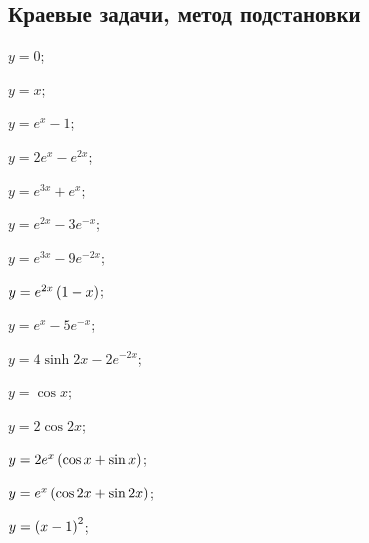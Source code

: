 \subsection*{Краевые задачи, метод подстановки}
	\begin{enumsols}

		\item \( y = 0 \); \sfill %
		\item \( y = x \); \sfill %
		\item \( y = e^{x} - 1 \); \sfill %
		\item \( y = 2 e^{x} - e^{2 x} \); \sfill %
		\item \( y = e^{3 x} + e^{x} \); \sfill %
		\item \( y = e^{2 x} - 3 e^{- x} \); \sfill %
		\item \( y = e^{3 x} - 9 e^{- 2 x} \); \sfill %
		\item \( y = e^{2 x} \left( 1 - x \right) \); \sfill %
		\item \( y = e^{x} - 5 e^{- x} \); \sfill %
		\item \( y = 4 \sinh{2x} - 2 e^{-2x} \); \sfill %
		\item \( y = \cos{x} \); \sfill %
		\item \( y = 2 \cos{2 x} \); \sfill %
		\item \( y = 2 e^{x} \left( \cos{x} + \sin{x} \right) \); \sfill %
		\item \( y = e^{x} \left( \cos{2 x} + \sin{2 x} \right) \); \sfill %
		\item \( y = \left( x - 1 \right)^2 \); \sfill %
		

\end{enumsols}
